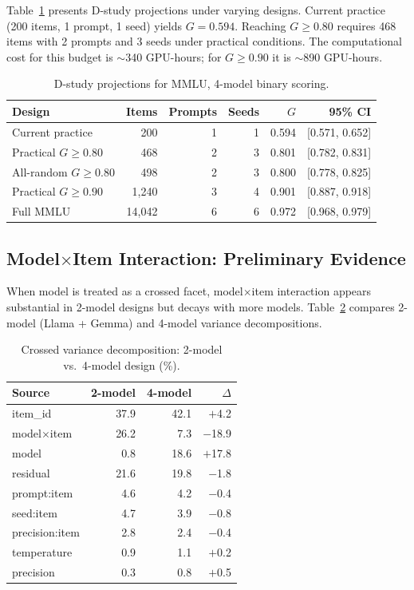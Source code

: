 \documentclass[letterpaper]{article}
\begin{document}
Table~\ref{tab:dstudy} presents D-study projections under varying designs. Current practice (200 items, 1 prompt, 1 seed) yields $G = 0.594$. Reaching $G \geq 0.80$ requires 468 items with 2 prompts and 3 seeds under practical conditions. The computational cost for this budget is $\sim$340 GPU-hours; for $G \geq 0.90$ it is $\sim$890 GPU-hours.

\begin{table}[t]
\centering
\caption{D-study projections for MMLU, 4-model binary scoring.}
\label{tab:dstudy}
\small
\begin{tabular}{lrrrrr}
\toprule
Design & Items & Prompts & Seeds & $G$ & 95\% CI \\
\midrule
Current practice & 200 & 1 & 1 & 0.594 & [0.571, 0.652] \\
Practical $G\!\geq\!0.80$ & 468 & 2 & 3 & 0.801 & [0.782, 0.831] \\
All-random $G\!\geq\!0.80$ & 498 & 2 & 3 & 0.800 & [0.778, 0.825] \\
Practical $G\!\geq\!0.90$ & 1,240 & 3 & 4 & 0.901 & [0.887, 0.918] \\
Full MMLU & 14,042 & 6 & 6 & 0.972 & [0.968, 0.979] \\
\bottomrule
\end{tabular}
\end{table}

\subsection{Model$\times$Item Interaction: Preliminary Evidence}
\label{sec:modelitem}

When model is treated as a crossed facet, model$\times$item interaction appears substantial in 2-model designs but decays with more models. Table~\ref{tab:crossmodel} compares 2-model (Llama + Gemma) and 4-model variance decompositions.

\begin{table}[t]
\centering
\caption{Crossed variance decomposition: 2-model vs.\ 4-model design (\%).}
\label{tab:crossmodel}
\small
\begin{tabular}{lrrr}
\toprule
Source & 2-model & 4-model & $\Delta$ \\
\midrule
item\_id & 37.9 & 42.1 & $+$4.2 \\
model$\times$item & 26.2 & 7.3 & $-$18.9 \\
model & 0.8 & 18.6 & $+$17.8 \\
residual & 21.6 & 19.8 & $-$1.8 \\
prompt:item & 4.6 & 4.2 & $-$0.4 \\
seed:item & 4.7 & 3.9 & $-$0.8 \\
precision:item & 2.8 & 2.4 & $-$0.4 \\
temperature & 0.9 & 1.1 & $+$0.2 \\
precision & 0.3 & 0.8 & $+$0.5 \\
\bottomrule
\end{tabular}
\end{table}
\end{document}
